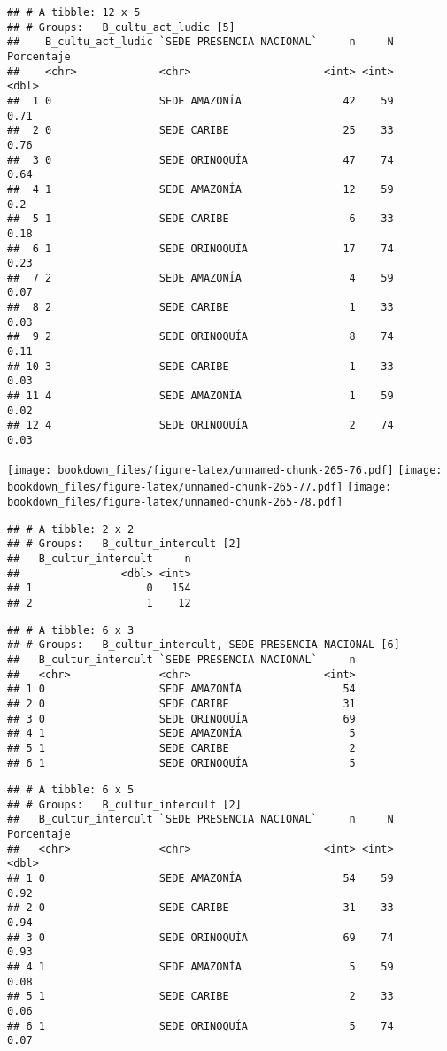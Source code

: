 \documentclass[]{article}
\theoremstyle{definition}
\theoremstyle{definition}
\theoremstyle{definition}
\theoremstyle{remark}
\begin{document}
\begin{verbatim}
## # A tibble: 12 x 5
## # Groups:   B_cultu_act_ludic [5]
##    B_cultu_act_ludic `SEDE PRESENCIA NACIONAL`     n     N Porcentaje
##    <chr>             <chr>                     <int> <int>      <dbl>
##  1 0                 SEDE AMAZONÍA                42    59       0.71
##  2 0                 SEDE CARIBE                  25    33       0.76
##  3 0                 SEDE ORINOQUÍA               47    74       0.64
##  4 1                 SEDE AMAZONÍA                12    59       0.2 
##  5 1                 SEDE CARIBE                   6    33       0.18
##  6 1                 SEDE ORINOQUÍA               17    74       0.23
##  7 2                 SEDE AMAZONÍA                 4    59       0.07
##  8 2                 SEDE CARIBE                   1    33       0.03
##  9 2                 SEDE ORINOQUÍA                8    74       0.11
## 10 3                 SEDE CARIBE                   1    33       0.03
## 11 4                 SEDE AMAZONÍA                 1    59       0.02
## 12 4                 SEDE ORINOQUÍA                2    74       0.03
\end{verbatim}

\texttt{[image: bookdown\_files/figure-latex/unnamed-chunk-265-76.pdf]}
\texttt{[image: bookdown\_files/figure-latex/unnamed-chunk-265-77.pdf]}
\texttt{[image: bookdown\_files/figure-latex/unnamed-chunk-265-78.pdf]}

\begin{verbatim}
## # A tibble: 2 x 2
## # Groups:   B_cultur_intercult [2]
##   B_cultur_intercult     n
##                <dbl> <int>
## 1                  0   154
## 2                  1    12
\end{verbatim}

\begin{verbatim}
## # A tibble: 6 x 3
## # Groups:   B_cultur_intercult, SEDE PRESENCIA NACIONAL [6]
##   B_cultur_intercult `SEDE PRESENCIA NACIONAL`     n
##   <chr>              <chr>                     <int>
## 1 0                  SEDE AMAZONÍA                54
## 2 0                  SEDE CARIBE                  31
## 3 0                  SEDE ORINOQUÍA               69
## 4 1                  SEDE AMAZONÍA                 5
## 5 1                  SEDE CARIBE                   2
## 6 1                  SEDE ORINOQUÍA                5
\end{verbatim}

\begin{verbatim}
## # A tibble: 6 x 5
## # Groups:   B_cultur_intercult [2]
##   B_cultur_intercult `SEDE PRESENCIA NACIONAL`     n     N Porcentaje
##   <chr>              <chr>                     <int> <int>      <dbl>
## 1 0                  SEDE AMAZONÍA                54    59       0.92
## 2 0                  SEDE CARIBE                  31    33       0.94
## 3 0                  SEDE ORINOQUÍA               69    74       0.93
## 4 1                  SEDE AMAZONÍA                 5    59       0.08
## 5 1                  SEDE CARIBE                   2    33       0.06
## 6 1                  SEDE ORINOQUÍA                5    74       0.07
\end{verbatim}
\end{document}
